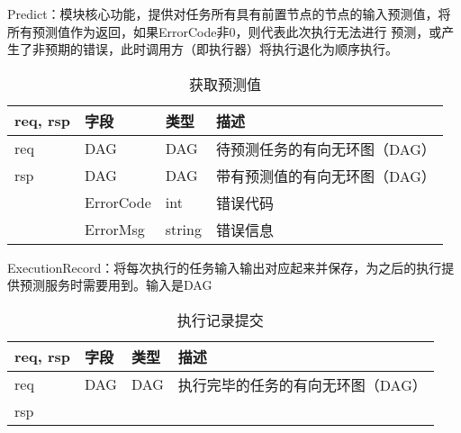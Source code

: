 Predict：模块核心功能，提供对任务所有具有前置节点的节点的输入预测值，将所有预测值作为返回，如果ErrorCode非0，则代表此次执行无法进行
预测，或产生了非预期的错误，此时调用方（即执行器）将执行退化为顺序执行。
    \begin{table}[H]
        \centering
        \caption{获取预测值}
        \label{tab:design-interface-predict}
        \begin{tabular}{llll}
            \toprule
            req, rsp   & 字段 & 类型 & 描述 \\
            \midrule
            req & DAG & DAG & 待预测任务的有向无环图（DAG） \\ \hline
            rsp & DAG & DAG & 带有预测值的有向无环图（DAG） \\
            & ErrorCode & int & 错误代码 \\
            & ErrorMsg & string & 错误信息 \\
            \bottomrule
        \end{tabular}
    \end{table}

ExecutionRecord：将每次执行的任务输入输出对应起来并保存，为之后的执行提供预测服务时需要用到。输入是DAG
    \begin{table}[H]
        \centering
        \caption{执行记录提交}
        \label{tab:design-interface-execution-record}
        \begin{tabular}{llll}
            \toprule
            req, rsp   & 字段 & 类型 & 描述 \\
            \midrule
            req & DAG & DAG & 执行完毕的任务的有向无环图（DAG）\\ \hline
            rsp & & & \\
            \bottomrule
        \end{tabular}
    \end{table}

